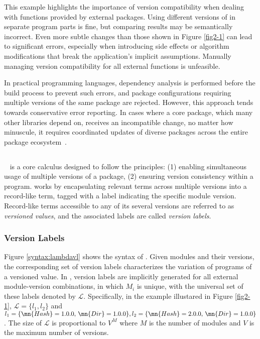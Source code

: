 This example highlights the importance of version compatibility when dealing with functions provided by external packages. Using different versions of  in separate program parts is fine, but comparing results may be semantically incorrect. Even more subtle changes than those shown in Figure \ref{fig2-1} can lead to significant errors, especially when introducing side effects or algorithm modifications that break the application's implicit assumptions. Manually managing version compatibility for all external functions is unfeasible.

In practical programming languages, dependency analysis is performed before the build process to prevent such errors, and package configurations requiring multiple versions of the same package are rejected. However, this approach tends towards conservative error reporting.
In cases where a core package, which many other libraries depend on, receives an incompatible change, no matter how minuscule, it requires coordinated updates of diverse packages across the entire package ecosystem~\cite{10.1007/s10664-014-9325-9,Tanabe_2021,semvertrick}.



\subsection{\corelang{}}
\label{core}
\corelang{}~\cite{Tanabe:2018:CPA:3242921.3242923,Tanabe_2021} is a core calculus designed to follow the principles: (1) enabling simultaneous usage of multiple versions of a package, (2) ensuring version consistency within a program. \corelang{} works by encapsulating relevant terms across multiple versions into a record-like term, tagged with a label indicating the specific module version. Record-like terms accessible to any of its several versions are referred to as \emph{versioned values}, and the associated labels are called \emph{version labels}.

\subsubsection{Version Labels}
Figure \ref{syntax:lambdavl} shows the syntax of \corelang{}.
Given modules and their versions, the corresponding set of version labels characterizes the variation of programs of a versioned value. 
In \corelang{}, version labels are implicitly generated for all external module-version combinations, in which $M_i$ is unique, with the universal set of these labels denoted by $\mathcal{L}$. 
Specifically, in the example illustared in Figure \ref{fig2-1}, $\mathcal{L} = \{l_1,l_2\}$ and $l_1 = \{\mn{Hash} = 1.0.0,\,\mn{Dir} = 1.0.0\}, l_2 = \{\mn{Hash} = 2.0.0,\,\mn{Dir} = 1.0.0\}$.
The size of $\mathcal{L}$ is proportional to $V^M$ where $M$ is the number of modules and $V$ is the maximum number of versions.

